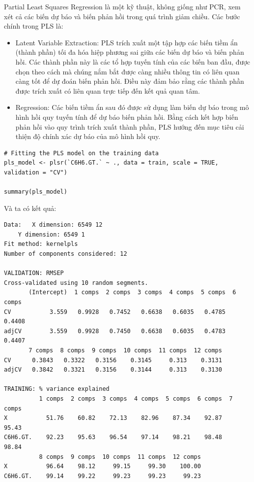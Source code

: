 Partial Least Squares Regression là một kỹ thuật, không giống như PCR, xem xét cả các biến dự báo và biến phản hồi trong quá trình giảm chiều. Các bước chính trong PLS là:
\begin{itemize}
    \item Latent Variable Extraction: PLS trích xuất một tập hợp các biến tiềm ẩn (thành phần) tối đa hóa hiệp phương sai giữa các biến dự báo và biến phản hồi. Các thành phần này là các tổ hợp tuyến tính của các biến ban đầu, được chọn theo cách mà chúng nắm bắt được càng nhiều thông tin có liên quan càng tốt để dự đoán biến phản hồi. Điều này đảm bảo rằng các thành phần được trích xuất có liên quan trực tiếp đến kết quả quan tâm.
    \item Regression: Các biến tiềm ẩn sau đó được sử dụng làm biến dự báo trong mô hình hồi quy tuyến tính để dự báo biến phản hồi. Bằng cách kết hợp biến phản hồi vào quy trình trích xuất thành phần, PLS hướng đến mục tiêu cải thiện độ chính xác dự báo của mô hình hồi quy.
\end{itemize}

\begin{lstlisting}
# Fitting the PLS model on the training data
pls_model <- plsr(`C6H6.GT.` ~ ., data = train, scale = TRUE, validation = "CV")

summary(pls_model)
\end{lstlisting}

Và ta có kết quả:
\begin{lstlisting}
Data: 	X dimension: 6549 12 
	Y dimension: 6549 1
Fit method: kernelpls
Number of components considered: 12

VALIDATION: RMSEP
Cross-validated using 10 random segments.
       (Intercept)  1 comps  2 comps  3 comps  4 comps  5 comps  6 comps
CV           3.559   0.9928   0.7452   0.6638   0.6035   0.4785   0.4408
adjCV        3.559   0.9928   0.7450   0.6638   0.6035   0.4783   0.4407
       7 comps  8 comps  9 comps  10 comps  11 comps  12 comps
CV      0.3843   0.3322   0.3156    0.3145     0.313    0.3131
adjCV   0.3842   0.3321   0.3156    0.3144     0.313    0.3130

TRAINING: % variance explained
          1 comps  2 comps  3 comps  4 comps  5 comps  6 comps  7 comps
X           51.76    60.82    72.13    82.96    87.34    92.87    95.43
C6H6.GT.    92.23    95.63    96.54    97.14    98.21    98.48    98.84
          8 comps  9 comps  10 comps  11 comps  12 comps
X           96.64    98.12     99.15     99.30    100.00
C6H6.GT.    99.14    99.22     99.23     99.23     99.23
\end{lstlisting}

